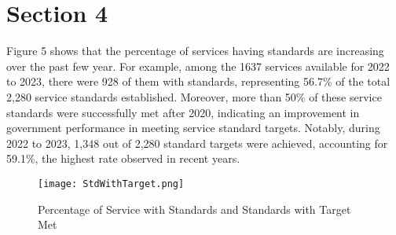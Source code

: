 \section{Section 4}

Figure 5 shows that the percentage of services having standards are
increasing over the past few year. For example, among the 1637 services 
available for 2022 to 2023, there were 928 of them with standards, 
representing 56.7\% of the total 2,280 service standards established. Moreover, 
more than 50\% of these service standards were successfully met after 2020, 
indicating an improvement in government performance in meeting service standard 
targets. Notably, during 2022 to 2023, 1,348 out of 2,280 standard targets were 
achieved, accounting for 59.1\%, the highest rate observed in recent years.

\begin{figure}[H]
    \centering
    \texttt{[image: StdWithTarget.png]}
    \caption{\label{fig:Std}Percentage of Service with Standards and Standards with Target Met}
\end{figure}
